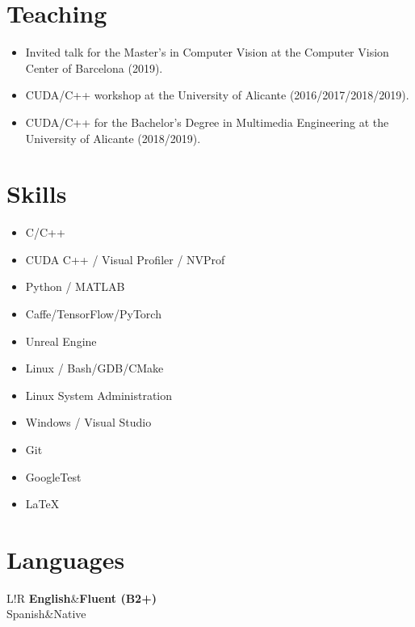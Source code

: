 \documentclass[8pt]{article}
\newcommand\VRule{\color{lightgray}\vrule width 0.5pt}
\begin{document}
\section*{Teaching}

\begin{itemize}
    \item Invited talk for the Master's in Computer Vision at the Computer Vision Center of Barcelona (2019).
    \item CUDA/C++ workshop at the University of Alicante (2016/2017/2018/2019).
    \item CUDA/C++ for the Bachelor's Degree in Multimedia Engineering at the University of Alicante (2018/2019).
\end{itemize}

\section*{Skills}

\begin{itemize}
	\item C/C++
	\item CUDA C++ / Visual Profiler / NVProf
	\item Python / MATLAB
	\item Caffe/TensorFlow/PyTorch
	\item Unreal Engine
	\item Linux / Bash/GDB/CMake
	\item Linux System Administration
	\item Windows / Visual Studio
	\item Git
	\item GoogleTest
	\item \LaTeX
\end{itemize}

\section*{Languages}
\begin{tabular}{L!{\VRule}R}
{\bf English}&{\bf Fluent (B2+)}\\
{Spanish}&{Native}\\
\end{tabular}
\end{document}
